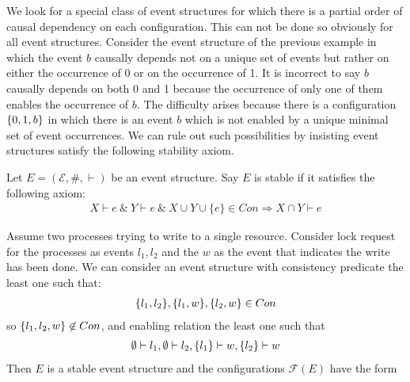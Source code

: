 \documentclass{article}
\begin{document}
We look for a special class of event structures for which there is a
partial order of causal dependency on each configuration.
This can not be done so obviously for all event structures.
Consider the event structure of the previous example in which
the event $b$ causally depends not on a unique set of events
but rather on either the occurrence of 0 or on the occurrence of 1.
It is incorrect to say $b$ causally depends on both 0 and 1 because
the occurrence of only one of them enables the occurrence of $b$.
The difficulty arises because there is a configuration $\{0,1,b\}$
in which there is an event $b$ which is not enabled by a unique minimal
set of event occurrences.
We can rule out such possibilities by insisting event structures
satisfy the following stability axiom.

\begin{definition}
    Let $E = (\mathcal{E},\#,\vdash)$ be an event structure. Say $E$ is stable if it satisfies the following axiom:
    \begin{align*}
        X \vdash e \ \& \ Y \vdash e \ \& \ X \cup Y \cup \{e\} \in Con \Rightarrow X \cap Y \vdash e
    \end{align*}
\end{definition}

\begin{example}
    Assume two processes trying to write to a single resource.
    Consider lock request for the processes as events $l_1,l_2$ 
    and the $w$ as the event that indicates the write has been done.
    We can consider an event structure
    with consistency predicate the least one such that:
    \begin{align*}
        \{l_1,l_2\},\{l_1,w\},\{l_2,w\} \in Con
    \end{align*}
    so $\{l_1,l_2,w\} \not \in Con$, and enabling relation the
    least one such that
    \begin{align*}
        \emptyset \vdash l_1, \emptyset \vdash l_2,
        \{l_1\} \vdash w, \{l_2\} \vdash w
    \end{align*}
    Then $E$ is a stable event structure and the configurations
    $\mathcal{F}(E)$ have the form
    \begin{center}
    \end{center}
\end{example}
\end{document}
